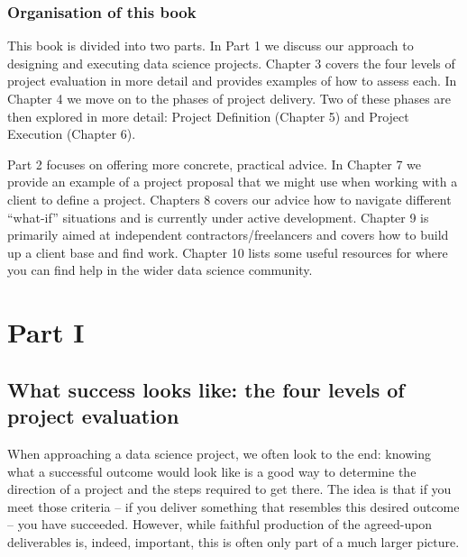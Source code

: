 \documentclass[
]{book}
\begin{document}
\hypertarget{organisation-of-this-book}{%
\section{Organisation of this book}\label{organisation-of-this-book}}

This book is divided into two parts. In Part 1 we discuss our approach to designing and executing data science projects. Chapter 3 covers the four levels of project evaluation in more detail and provides examples of how to assess each. In Chapter 4 we move on to the phases of project delivery. Two of these phases are then explored in more detail: Project Definition (Chapter 5) and Project Execution (Chapter 6).

Part 2 focuses on offering more concrete, practical advice. In Chapter 7 we provide an example of a project proposal that we might use when working with a client to define a project. Chapters 8 covers our advice how to navigate different ``what-if'' situations and is currently under active development. Chapter 9 is primarily aimed at independent contractors/freelancers and covers how to build up a client base and find work. Chapter 10 lists some useful resources for where you can find help in the wider data science community.

\hypertarget{part-part-i}{%
\part*{Part I}\label{part-part-i}}

\hypertarget{what-success-looks-like-the-four-levels-of-project-evaluation}{%
\chapter{What success looks like: the four levels of project evaluation}\label{what-success-looks-like-the-four-levels-of-project-evaluation}}

When approaching a data science project, we often look to the end: knowing what a successful outcome would look like is a good way to determine the direction of a project and the steps required to get there. The idea is that if you meet those criteria -- if you deliver something that resembles this desired outcome -- you have succeeded. However, while faithful production of the agreed-upon deliverables is, indeed, important, this is often only part of a much larger picture.
\end{document}
